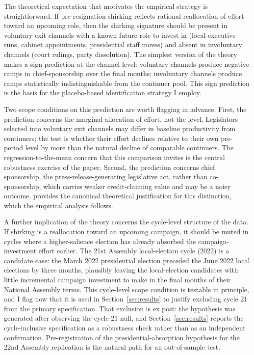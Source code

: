 \documentclass[11pt]{article}
\begin{document}
The theoretical expectation that motivates the empirical strategy is straightforward. If pre-resignation shirking reflects rational reallocation of effort toward an upcoming role, then the shirking signature should be present in voluntary exit channels with a known future role to invest in (local-executive runs, cabinet appointments, presidential staff moves) and absent in involuntary channels (court rulings, party dissolution). The simplest version of the theory makes a sign prediction at the channel level: voluntary channels produce negative ramps in chief-sponsorship over the final months; involuntary channels produce ramps statistically indistinguishable from the continuer pool. This sign prediction is the basis for the placebo-based identification strategy I employ.

Two scope conditions on this prediction are worth flagging in advance. First, the prediction concerns the marginal allocation of effort, not the level. Legislators selected into voluntary exit channels may differ in baseline productivity from continuers; the test is whether their effort declines relative to their own pre-period level by more than the natural decline of comparable continuers. The regression-to-the-mean concern that this comparison invites is the central robustness exercise of the paper. Second, the prediction concerns chief sponsorship, the press-release-generating legislative act, rather than co-sponsorship, which carries weaker credit-claiming value and may be a noisy outcome. \citet{mayhew1974} provides the canonical theoretical justification for this distinction, which the empirical analysis follows.

A further implication of the theory concerns the cycle-level structure of the data. If shirking is a reallocation toward an upcoming campaign, it should be muted in cycles where a higher-salience election has already absorbed the campaign-investment effort earlier. The 21st Assembly local-election cycle (2022) is a candidate case: the March 2022 presidential election preceded the June 2022 local elections by three months, plausibly leaving the local-election candidates with little incremental campaign investment to make in the final months of their National Assembly terms. This cycle-level scope condition is testable in principle, and I flag now that it is used in Section~\ref{sec:results} to justify excluding cycle 21 from the primary specification. That exclusion is ex post: the hypothesis was generated after observing the cycle-21 null, and Section~\ref{sec:results} reports the cycle-inclusive specification as a robustness check rather than as an independent confirmation. Pre-registration of the presidential-absorption hypothesis for the 22nd Assembly replication is the natural path for an out-of-sample test.
\end{document}
